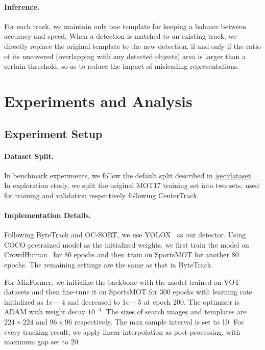 \documentclass[10pt,twocolumn,letterpaper]{article}
\begin{document}
\vspace{-4mm}
\paragraph{Inference.}
For each track, we maintain only one template for keeping a balance between accuracy and speed. When a detection is matched to an existing track, we directly replace the original template to the new detection, if and only if the ratio of its uncovered (\ie overlapping with any detected objects) area is larger than a certain threshold, so as to reduce the impact of misleading representations.

\section{Experiments and Analysis}

\subsection{Experiment Setup}
\paragraph{Dataset Split.}
In benchmark experiments, we follow the default split described in \cref{sec:dataset}. In exploration study, we split the original MOT17 training set into two sets, used for training and validation respectively following CenterTrack.

\vspace{-4mm}
\paragraph{Implementation Details.}
Following ByteTrack and OC-SORT, we use YOLOX~\cite{ge2021yolox} as our detector. Using COCO-pretrained model as the initialized weights, we first train the model on CrowdHuman~\cite{shao2018crowdhuman} for 80 epochs and then train on SportsMOT for another 80 epochs. The remaining settings are the same as that in ByteTrack.

For MixFormer, we initialize the backbone with the model trained on VOT datasets and then fine-tune it on SportsMOT for 300 epochs with learning rate initialized as $1e-4$ and decreased to $1e-5$ at epoch 200. The optimizer is ADAM\cite{kingma2014adam} with weight decay $10^{-4}$. The sizes of search images and templates are $224\times224$ and $96\times96$ respectively. The max sample interval is set to 10.
For every tracking result, we apply linear interpolation as post-processing, with maximum gap set to 20.
\end{document}
